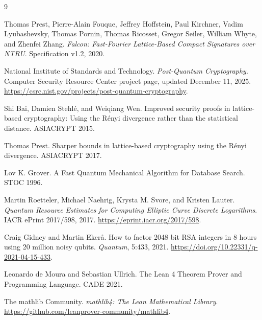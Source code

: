 \documentclass[11pt]{article}
\begin{document}
\begin{thebibliography}{9}

Thomas Prest, Pierre-Alain Fouque, Jeffrey Hoffstein, Paul Kirchner, Vadim Lyubashevsky, Thomas Pornin, Thomas Ricosset, Gregor Seiler, William Whyte, and Zhenfei Zhang.
\newblock \emph{Falcon: Fast-Fourier Lattice-Based Compact Signatures over NTRU}.
\newblock Specification v1.2, 2020.

National Institute of Standards and Technology.
\newblock \emph{Post-Quantum Cryptography}.
\newblock Computer Security Resource Center project page, updated December 11, 2025.
\newblock \url{https://csrc.nist.gov/projects/post-quantum-cryptography}.

Shi Bai, Damien Stehl\'e, and Weiqiang Wen.
\newblock Improved security proofs in lattice-based cryptography: Using the R\'{e}nyi divergence rather than the statistical distance.
\newblock ASIACRYPT 2015.

Thomas Prest.
\newblock Sharper bounds in lattice-based cryptography using the R\'{e}nyi divergence.
\newblock ASIACRYPT 2017.

Lov K. Grover.
\newblock A Fast Quantum Mechanical Algorithm for Database Search.
\newblock STOC 1996.

Martin Roetteler, Michael Naehrig, Krysta M. Svore, and Kristen Lauter.
\newblock \emph{Quantum Resource Estimates for Computing Elliptic Curve Discrete Logarithms}.
\newblock IACR ePrint 2017/598, 2017.
\newblock \url{https://eprint.iacr.org/2017/598}.

Craig Gidney and Martin Eker{\aa}.
\newblock How to factor 2048 bit RSA integers in 8 hours using 20 million noisy qubits.
\newblock \emph{Quantum}, 5:433, 2021.
\newblock \url{https://doi.org/10.22331/q-2021-04-15-433}.

Leonardo de Moura and Sebastian Ullrich.
\newblock The Lean 4 Theorem Prover and Programming Language.
\newblock CADE 2021.

The mathlib Community.
\newblock \emph{mathlib4: The Lean Mathematical Library}.
\newblock \url{https://github.com/leanprover-community/mathlib4}.

\end{thebibliography}
\end{document}
